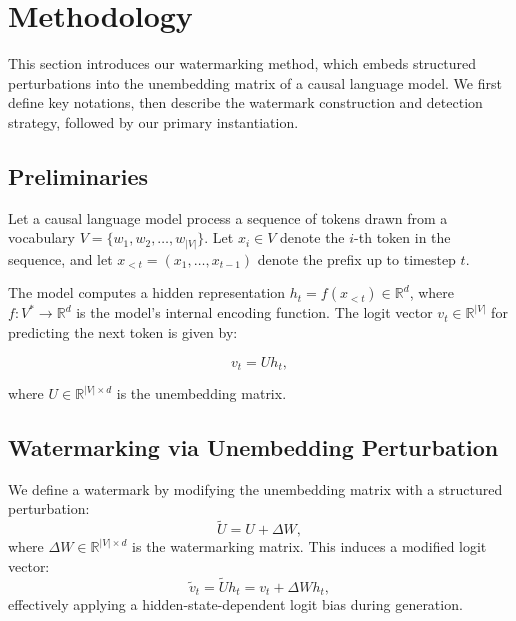 \section{Methodology}
\label{sec:methodology}

This section introduces our watermarking method, which embeds structured perturbations into the unembedding matrix of a causal language model. We first define key notations, then describe the watermark construction and detection strategy, followed by our primary instantiation.

\subsection{Preliminaries}

Let a causal language model process a sequence of tokens drawn from a vocabulary \( V = \{w_1, w_2, \dots, w_{|V|}\} \). Let \( x_i \in V \) denote the \( i \)-th token in the sequence, and let \( x_{<t} = (x_1, \dots, x_{t-1}) \) denote the prefix up to timestep \( t \).

The model computes a hidden representation \( h_t = f(x_{<t}) \in \mathbb{R}^d \), where \( f: V^* \rightarrow \mathbb{R}^d \) is the model's internal encoding function. The logit vector \( v_t \in \mathbb{R}^{|V|} \) for predicting the next token is given by:

\begin{equation}
    v_t = U h_t,
\end{equation}

where \( U \in \mathbb{R}^{|V| \times d} \) is the unembedding matrix.

\subsection{Watermarking via Unembedding Perturbation}

We define a watermark by modifying the unembedding matrix with a structured perturbation:
\begin{equation}
    \tilde{U} = U + \Delta W,
\end{equation}
where \( \Delta W \in \mathbb{R}^{|V| \times d} \) is the watermarking matrix. This induces a modified logit vector:
\begin{equation}
    \tilde{v}_t = \tilde{U} h_t = v_t + \Delta W h_t,
\end{equation}
effectively applying a hidden-state-dependent logit bias during generation.

